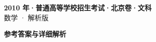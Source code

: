 \documentclass[zihao=-4, a4paper]{ctexart}
\begin{document}
\begin{center}
  {\Large\bfseries 2010 年·普通高等学校招生考试·北京卷·文科}\\[4pt]
  {\large 数学 · 解析版}
\end{center}
\medskip
{}

\clearpage
{}
\begin{center}{\Large\bfseries 参考答案与详细解析}\end{center}
\medskip

\end{document}
